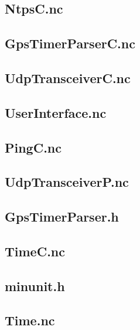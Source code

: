 \documentclass[12pt,a4paper,titlepage,oneside]{article}
\begin{document}
{\subsection{NtpsC.nc}


\subsection{GpsTimerParserC.nc}


\subsection{UdpTransceiverC.nc}


\subsection{UserInterface.nc}


\subsection{PingC.nc}


\subsection{UdpTransceiverP.nc}


\subsection{GpsTimerParser.h}


\subsection{TimeC.nc}


\subsection{minunit.h}


\subsection{Time.nc}


}
\end{document}
